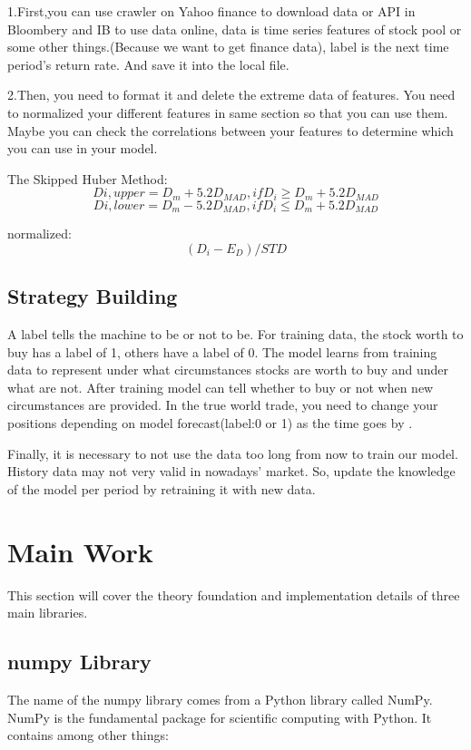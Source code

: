 \documentclass[a4paper]{article}
\begin{document}
1.First,you can use crawler on Yahoo finance to download data or API in Bloombery and IB to use data online, data is time series features of stock pool or some other things.(Because we want to get finance data), label is the next time period's return rate. And save it into the local file.


2.Then, you need to format it and delete the extreme data of features. You need to normalized your different features in same section so that you can use them. Maybe you can check the correlations between your features to determine which you can use in your model.

The Skipped Huber Method:
\[ D{i,upper} = D_m +5.2D_{MAD},     if D_i \geq D_m+5.2D_{MAD} \]
\[ D{i,lower} = D_m -5.2D_{MAD},     if D_i \leq D_m+5.2D_{MAD} \]

normalized:\[ (D_i-E_D)/STD\]

\subsection{Strategy Building}
A label tells the machine to be or not to be. For training data, the stock worth to buy has a label of 1, others have a label of 0. The model learns from training data to represent under what circumstances stocks are worth to buy and under what are not. After training model can tell whether to buy or not when new circumstances are provided. In the true world trade, you need to change your positions depending on model forecast(label:0 or 1) as the time goes by . 


Finally, it is necessary to not use the data too long from now to train our model. History data may not very valid in nowadays’ market. So, update the knowledge of the model per period by retraining it with new data.

\section{Main Work}
This section will cover the theory foundation and implementation details of three main libraries.   

\subsection{numpy Library}
The name of the numpy library comes from a Python library called NumPy. NumPy is the fundamental package for scientific computing with Python.\cite{nano2} It contains among other things:
\end{document}
